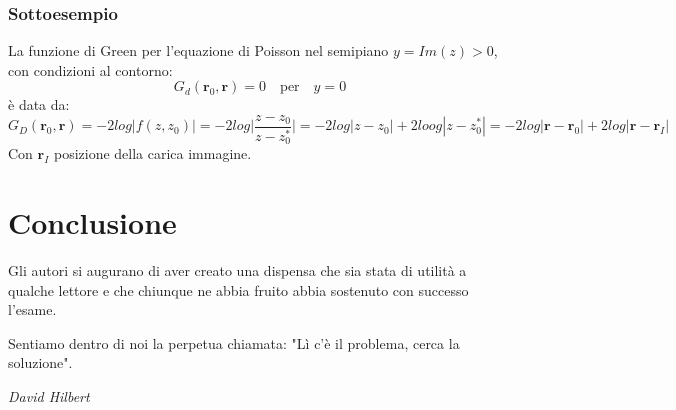 \documentclass[twoside]{article}
\renewcommand{\vec}[1]{\textbf{#1}}
\begin{document}
\subsubsection{Sottoesempio}
La funzione di Green per l'equazione di Poisson nel semipiano $y=Im(z)>0$, con condizioni al contorno:
\begin{equation}
    G_d(\vec{r}_0,\vec{r})=0 \quad \text{per} \quad y=0
\end{equation}
è data da:
\begin{equation*}
    G_D(\vec{r}_0,\vec{r})=-2log|f(z,z_0)|=-2log\biggl|\frac{z-z_0}{z-z_0^*}\biggr|=-2log|z-z_0|+2 loog|z-z_0^*|=-2log|\vec{r}-\vec{r}_0|+2log|\vec{r}-\vec{r}_I|
\end{equation*}
Con $\vec{r}_I$ posizione della carica immagine.



\newpage











\newpage

\section{Conclusione}
Gli autori si augurano di aver creato una dispensa che sia stata di utilità a qualche lettore e che chiunque ne abbia fruito abbia sostenuto con successo l'esame.
\vfill
\epigraph{Sentiamo dentro di noi la perpetua chiamata: "Lì c'è il problema, cerca la soluzione".}{\textit{David Hilbert} }
\end{document}

